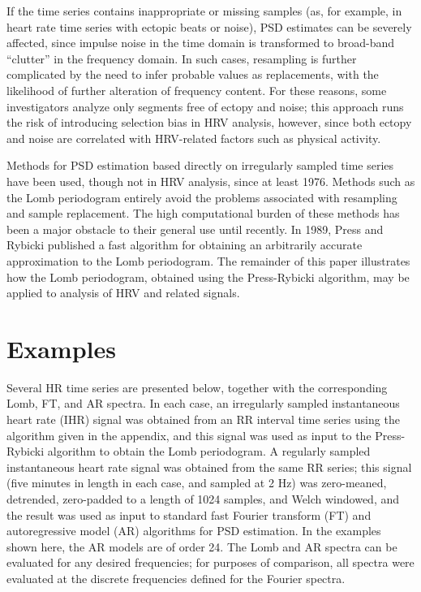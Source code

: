\documentclass[twocolumn]{cinc}
\begin{document}
If the time series contains inappropriate or missing samples (as, for
example, in heart rate time series with ectopic beats or noise), PSD
estimates can be severely affected, since impulse noise in the time
domain is transformed to broad-band ``clutter'' in the frequency
domain.  In such cases, resampling is further complicated by the need
to infer probable values as replacements\cite{PA-88}, with the
likelihood of further alteration of frequency content\cite{CB-91}.
For these reasons, some investigators analyze only segments free of
ectopy and noise\cite{RK-87}; this approach runs the risk of
introducing selection bias in HRV analysis, however, since both ectopy
and noise are correlated with HRV-related factors such as physical
activity.

Methods for PSD estimation based directly on irregularly sampled time
series have been used, though not in HRV analysis, since at least
1976\cite{NL-76,RJ-81}.  Methods such as the Lomb periodogram
entirely avoid the problems associated with resampling and sample
replacement.  The high computational burden of these methods has been
a major obstacle to their general use\cite{RB-92} until recently.  In
1989, Press and Rybicki published a fast algorithm for obtaining an
arbitrarily accurate approximation to the Lomb
periodogram\cite{WP-89,NR-92}.  The remainder of this paper
illustrates how the Lomb periodogram, obtained using the Press-Rybicki
algorithm, may be applied to analysis of HRV and related signals.

\section{Examples}

Several HR time series are presented below, together with the
corresponding Lomb, FT, and AR spectra.  In each case, an irregularly
sampled instantaneous heart rate (IHR) signal was obtained from an RR
interval time series using the algorithm given in the appendix, and
this signal was used as input to the Press-Rybicki algorithm to obtain
the Lomb periodogram.  A regularly sampled instantaneous heart rate
signal\cite{GM-92} was obtained from the same RR series; this signal
(five minutes in length in each case, and sampled at 2 Hz) was
zero-meaned, detrended, zero-padded to a length of 1024 samples, and
Welch windowed, and the result was used as input to standard fast
Fourier transform (FT) and autoregressive model (AR) algorithms for
PSD estimation\cite{NR-92}.  In the examples shown here, the AR models
are of order 24.  The Lomb and AR spectra can be evaluated for any
desired frequencies; for purposes of comparison, all spectra were
evaluated at the discrete frequencies defined for the Fourier spectra.
\end{document}
